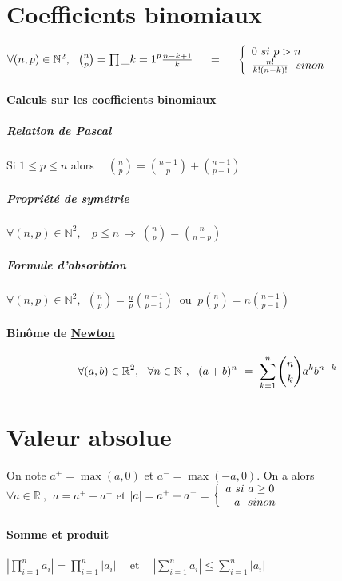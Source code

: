  \section{Coefficients binomiaux}
 
 $\forall (n,p) \in \mathbb{N}^2 ,~~ \binom{n}{p} = \pk{1}{p} \frac{n-k+1}{k} ~~~~ =~~~~ \left\{ \ar* 0 ~si~p>n \\\frac{n!}{k!(n-k)!} ~~sinon \ar \right.$
 
 \paragraph{Calculs sur les coefficients binomiaux}
 
 \subparagraph{Relation de Pascal}
 
 Si $1\leq p \leq n$ alors $~~~~ \binom{n}{p} = \binom{n-1}{p} + \binom{n-1}{p-1}$
 
 \subparagraph{Propriété de symétrie}
 
 $\forall (n,p) \in \mathbb{N}^2 ,~~~~p\leq n ~\Rightarrow ~\binom{n}{p} = \binom{n}{n-p}$
 
 \subparagraph{Formule d'absorbtion}
 
 $\forall (n,p)\in\mathbb{N}^2 ,~~ \binom{n}{p} = \frac{n}{p}\binom{n-1}{p-1}~$ ou $~p\binom{n}{p} = n\binom{n-1}{p-1}$
 
 \paragraph{Binôme de \underline{Newton}}
 
 \[\forall (a,b)\in\mathbb{R}^2 ,~~\forall n\in\mathbb{N} ~,~~ (a+b)^n ~=~ \sum_{k= 1 }^{n} \binom{n}{k} a^k b^{n-k}\]
 
 \section{Valeur absolue}
 
 On note $a^+ = \max (a,0)$ et $a^- = \max (-a, 0)$. On a alors\\
 $\forall a\in \mathbb{R} ~,~~ a = a^+ - a^-$ et $ \vert a\vert = a^+ + a^- = \left\{ \ar* a~si ~a\geq 0 \\ -a ~~sinon \ar \right.$
 
 \paragraph{Somme et produit}
 
 $\left\vert \prod\limits_{i=1}^{n} a_i \right\vert = \prod\limits_{i=1}^{n} \vert a_i\vert ~~~~$ et $~~~~\left\vert \sum\limits_{i=1}^n a_i \right\vert \leq \sum\limits_{i=1}^n \vert a_i \vert$
 
